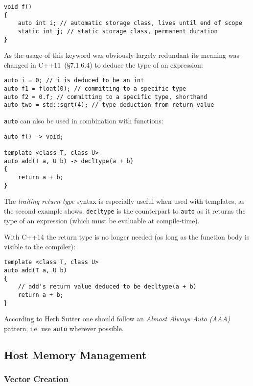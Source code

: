 \begin{lstlisting}
void f()
{
    auto int i; // automatic storage class, lives until end of scope
    static int j; // static storage class, permanent duration
}
\end{lstlisting}

As the usage of this keyword was obviously largely redundant its meaning was changed in C++11~\cite{cpp11std}(§7.1.6.4) to deduce the type of an expression:

\begin{lstlisting}
auto i = 0; // i is deduced to be an int
auto f1 = float(0); // committing to a specific type
auto f2 = 0.f; // committing to a specific type, shorthand
auto two = std::sqrt(4); // type deduction from return value
\end{lstlisting}

\texttt{auto} can also be used in combination with functions:

\begin{lstlisting}
auto f() -> void;

template <class T, class U>
auto add(T a, U b) -> decltype(a + b)
{
    return a + b;
}
\end{lstlisting}

The \textit{trailing return type} syntax is especially useful when used with templates, as the second example shows. \texttt{decltype} is the counterpart to \texttt{auto} as it returns the type of an expression (which must be evaluable at compile-time).

With C++14 the return type is no longer needed (as long as the function body is visible to the compiler):

\begin{lstlisting}
template <class T, class U>
auto add(T a, U b)
{
    // add's return value deduced to be decltype(a + b)
    return a + b;
}
\end{lstlisting}

According to Herb Sutter\cite{sutteraaa} one should follow an \textit{Almost Always Auto (AAA)} pattern, i.e. use \texttt{auto} wherever possible.

\subsection{Host Memory Management}

\subsubsection{Vector Creation}

